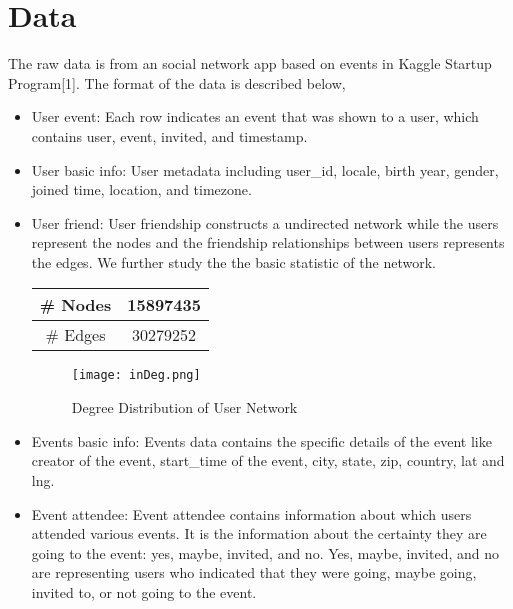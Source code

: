 \documentclass{article}
\begin{document}
\section{Data}
The raw data is from an social network app based on events in Kaggle Startup Program[1]. The format of the data is described below, 
\begin{itemize}
\item User event: Each row indicates an event that was shown to a user, which contains user, event, invited, and timestamp.

\item User basic info: User metadata including user\_id, locale, birth year, gender, joined time, location, and timezone.

\item User friend: User friendship constructs a undirected network while the users represent the nodes and the friendship relationships between users represents the edges. We further study the the basic statistic of the network.
\begin{center}

\begin{tabular}{|c|c|}
\hline
\# Nodes&15897435 \\ \hline
\# Edges&30279252 \\ \hline
\end{tabular}
\end{center}

\begin{figure}[h]
\begin{center}
\texttt{[image: inDeg.png]}
\caption{Degree Distribution of User Network}
\label{fig:degdis}
\end{center}
\end{figure}



\item Events basic info: Events data contains the specific details of the event like creator of the event, start\_time of the event, city, state, zip, country, lat and lng.

\item Event attendee: Event attendee contains information about which users attended various events. It is the information about the certainty they are going to the event: yes, maybe, invited, and no. Yes, maybe, invited, and no are representing users who indicated that they were going, maybe going, invited to, or not going to the event.
\end{itemize}
\end{document}

